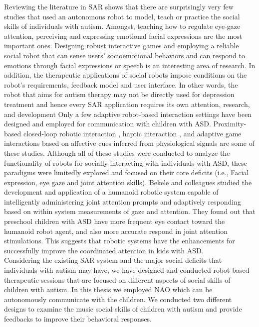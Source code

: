 Reviewing the literature in SAR \cite{DefineSocial2005, SocialInteract2003} shows that there are surprisingly very few
studies that used an autonomous robot to model, teach or practice the social skills of
individuals with autism. Amongst, teaching how to regulate eye-gaze attention, perceiving
and expressing emotional facial expressions are the most important ones. Designing robust
interactive games and employing a reliable social robot that can sense users’ socioemotional
behaviors and can respond to emotions through facial expressions or speech is
an interesting area of research. In addition, the therapeutic applications of social robots
impose conditions on the robot’s requirements, feedback model and user interface. In other
words, the robot that aims for autism therapy may not be directly used for depression
treatment and hence every SAR application requires its own attention, research, and
development
Only a few adaptive robot-based interaction settings have been designed and
employed for communication with children with ASD. Proximity-based closed-loop
robotic interaction \cite{LookApproach1972}, haptic interaction \cite{DiffEffect1966}, and adaptive game interactions based on
affective cues inferred from physiological signals \cite{SysObserv1968} are some of these studies. Although
all of these studies were conducted to analyze the functionality of robots for socially interacting with individuals 
with ASD, these paradigms were limitedly explored and
focused on their core deficits (i.e., Facial expression, eye gaze and joint attention skills).
Bekele and colleagues \cite{AutisticDist1943} studied the development and application of a humanoid
robotic system capable of intelligently administering joint attention prompts and adaptively
responding based on within system measurements of gaze and attention. They found out
that preschool children with ASD have more frequent eye contact toward the humanoid
robot agent, and also more accurate respond in joint attention stimulations. This suggests
that robotic systems have the enhancements for successfully improve the coordinated
attention in kids with ASD.\\

Considering the existing SAR system and the major social deficits that individuals
with autism may have, we have designed and conducted robot-based therapeutic sessions
that are focused on different aspects of social skills of children with autism. In this thesis
we employed NAO which can be autonomously communicate with the children.
We conducted two different designs to examine the music social skills of children with autism
and provide feedbacks to improve their behavioral responses. \\


